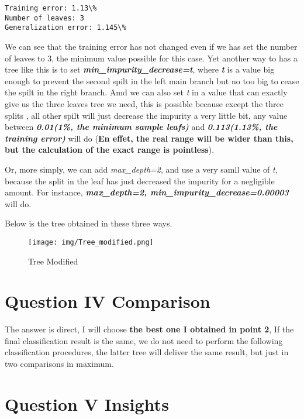 \documentclass[11pt]{article}
\makeatletter
\def\maxwidth{\ifdim\Gin@nat@width>\linewidth\linewidth
    \else\Gin@nat@width\fi}
\let\Oldincludegraphics\includegraphics
\renewcommand{\includegraphics}[1]{\Oldincludegraphics[width=.8\maxwidth]{#1}}
\makeatother
\begin{document}
    \begin{Verbatim}[commandchars=\\\{\}]
Training error: 1.13\%
Number of leaves: 3
Generalization error: 1.145\%

    \end{Verbatim}

    We can see that the training error has not changed even if we has set
the number of leaves to 3, the minimum value possible for this case. Yet
another way to has a tree like this is to set
\textbf{\emph{min\_impurity\_decrease=t}}, where \textbf{\emph{t}} is a
value big enough to prevent the second spilt in the left main branch but
no too big to cease the spilt in the right branch. Amd we can also set
\emph{t} in a value that can exactly give us the three leaves tree we
need, this is possible because except the three splits , all other spilt
will just decrease the impurity a very little bit, any value between
\textbf{\emph{0.01(1\%, the minimum sample leafs)}} and
\textbf{\emph{0.113(1.13\%, the training error)}} will do (\textbf{En
effet, the real range will be wider than this, but the calculation of
the exact range is pointless}).

Or, more simply, we can add \emph{max\_depth=2}, and use a very samll
value of \emph{t}, because the split in the leaf has just decreased the
impurity for a negligible amount. For instance,
\textbf{\emph{max\_depth=2, min\_impurity\_decrease=0.00003}} will do.

Below is the tree obtained in these three ways.

\begin{figure}
\centering
\texttt{[image: img/Tree\_modified.png]}
\caption{Tree Modified}
\end{figure}

    \section{Question IV Comparison}\label{question-iv-comparison}

    The answer is direct, I will choose \textbf{the best one I obtained in
point 2}, If the final classification result is the same, we do not need
to perform the following classification procedures, the latter tree will
deliver the same result, but just in two comparisons in maximum.

    \section{Question V Insights}\label{question-v-insights}
\end{document}
